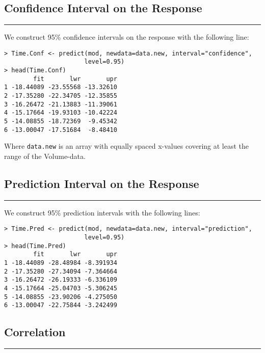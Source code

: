 \subsection{Confidence Interval on the Response}
\noindent\rule[\linienAbstand]{\linewidth}{\linienDicke}
We construct 95\% confidence intervals on the response with the following line:
\begingroup
\scriptsize
\begin{verbatim}
> Time.Conf <- predict(mod, newdata=data.new, interval="confidence",
                      level=0.95)
> head(Time.Conf)
        fit       lwr       upr
1 -18.44089 -23.55568 -13.32610
2 -17.35280 -22.34705 -12.35855
3 -16.26472 -21.13883 -11.39061
4 -15.17664 -19.93103 -10.42224
5 -14.08855 -18.72369  -9.45342
6 -13.00047 -17.51684  -8.48410
\end{verbatim}
\endgroup
Where \texttt{data.new} is an array with equally spaced x-values covering at least the range of the Volume-data.\\

\subsection{Prediction Interval on the Response}
\noindent\rule[\linienAbstand]{\linewidth}{\linienDicke}
We construct 95\% prediction intervals with the following lines:
\begingroup
\scriptsize
\begin{verbatim}
> Time.Pred <- predict(mod, newdata=data.new, interval="prediction",
                      level=0.95)
> head(Time.Pred)
        fit       lwr       upr
1 -18.44089 -28.48984 -8.391934
2 -17.35280 -27.34094 -7.364664
3 -16.26472 -26.19333 -6.336109
4 -15.17664 -25.04703 -5.306245
5 -14.08855 -23.90206 -4.275050
6 -13.00047 -22.75844 -3.242499
\end{verbatim}
\endgroup

\subsection{Correlation}
\noindent\rule[\linienAbstand]{\linewidth}{\linienDicke}

